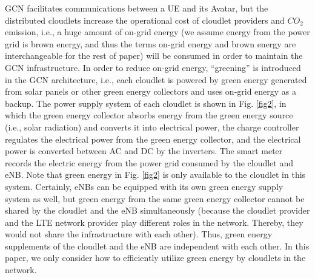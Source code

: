 \documentclass[journal,12pt,draftclsnofoot,onecolumn]{IEEEtran}
\begin{document}
GCN facilitates communications between a UE and its Avatar, but the distributed cloudlets increase the operational cost of cloudlet providers and $CO_{2}$ emission, i.e., a huge amount of on-grid energy (we assume energy from the power grid is brown energy, and thus the terms on-grid energy and brown energy are interchangeable for the rest of paper) will be consumed in order to maintain the GCN infrastructure. In order to reduce on-grid energy, “greening” is introduced in the GCN architecture, i.e., each cloudlet is powered by green energy generated from solar panels or other green energy collectors and uses on-grid energy as a backup. The power supply system of each cloudlet is shown in Fig. \ref{fig2}, in which the green energy collector absorbs energy from the green energy source (i.e., solar radiation) and converts it into electrical power, the charge controller regulates the electrical power from the green energy collector, and the electrical power is converted between AC and DC by the inverters. The smart meter records the electric energy from the power grid consumed by the cloudlet and eNB. Note that green energy in Fig. \ref{fig2} is only available to the cloudlet in this system. Certainly, eNBs can be equipped with its own green energy supply system as well, but green energy from the same green energy collector cannot be shared by the cloudlet and the eNB simultaneously (because the cloudlet provider and the LTE network provider play different roles in the network. Thereby, they would not share the infrastructure with each other). Thus, green energy supplements of the cloudlet and the eNB are independent with each other. In this paper, we only consider how to efficiently utilize green energy by cloudlets in the network.  \
\end{document}
